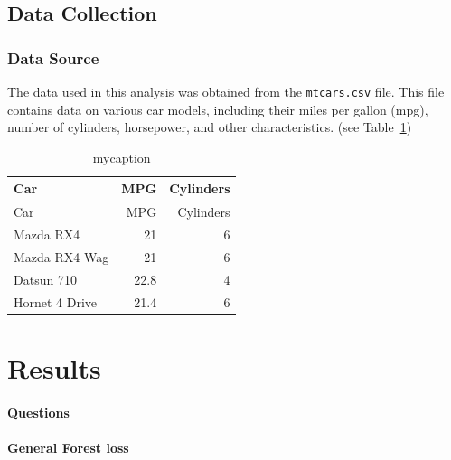 \documentclass[
  letterpaper,
  DIV=11,
  numbers=noendperiod]{scrreprt}
\begin{document}
\hypertarget{data-collection}{%
\section{Data Collection}\label{data-collection}}

\hypertarget{data-source}{%
\subsection{Data Source}\label{data-source}}

The data used in this analysis was obtained from the \texttt{mtcars.csv}
file. This file contains data on various car models, including their
miles per gallon (mpg), number of cylinders, horsepower, and other
characteristics. (see Table~\ref{tbl-mytable3})

\hypertarget{tbl-mytable3}{}
\begin{longtable}[]{@{}lrr@{}}
\caption{\label{tbl-mytable3}mycaption}\tabularnewline
\toprule\noalign{}
Car & MPG & Cylinders \\
\midrule\noalign{}
\endfirsthead
\toprule\noalign{}
Car & MPG & Cylinders \\
\midrule\noalign{}
\endhead
\bottomrule\noalign{}
\endlastfoot
Mazda RX4 & 21 & 6 \\
Mazda RX4 Wag & 21 & 6 \\
Datsun 710 & 22.8 & 4 \\
Hornet 4 Drive & 21.4 & 6 \\
\end{longtable}


\hypertarget{results}{%
\chapter{Results}\label{results}}

\hypertarget{questions}{%
\subsubsection{Questions}\label{questions}}

\hypertarget{general-forest-loss}{%
\subsubsection{General Forest loss}\label{general-forest-loss}}
\end{document}
